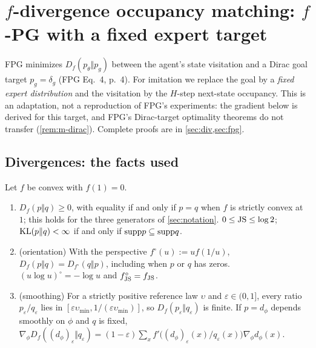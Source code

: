 \section{\texorpdfstring{$f$}{f}-divergence occupancy matching: \texorpdfstring{$f$}{f}-PG with a fixed expert target}\label{sec:m-fpg}

FPG minimizes $D_f(p_\theta\Vert p_g)$ between the agent's state visitation and a Dirac goal target $p_g=\delta_g$ (FPG Eq.~4, p.~4).
For imitation we replace the goal by a \emph{fixed expert distribution} and the visitation by the $H$-step next-state occupancy.
This is an adaptation, not a reproduction of FPG's experiments: the gradient below is derived for this target, and FPG's Dirac-target optimality theorems do not transfer (\cref{rem:m-dirac}).
Complete proofs are in \cref{sec:div,sec:fpg}.

\subsection{Divergences: the facts used}

\begin{proposition}\label{prop:m-div}
Let $f$ be convex with $f(1)=0$.
\begin{enumerate}[nosep,label=(\alph*)]
\item $D_f(p\Vert q)\ge0$, with equality if and only if $p=q$ when $f$ is strictly convex at $1$; this holds for the three generators of \cref{sec:notation}. $0\le\mathrm{JS}\le\log2$; $\mathrm{KL}(p\Vert q)<\infty$ if and only if $\mathrm{supp} p\subseteq\mathrm{supp} q$.
\item (orientation) With the perspective $f^\circ(u):=uf(1/u)$, $D_f(p\Vert q)=D_{f^\circ}(q\Vert p)$, including when $p$ or $q$ has zeros. $(u\log u)^\circ=-\log u$ and $f_{\mathrm{JS}}^\circ=f_{\mathrm{JS}}$.
\item (smoothing) For a strictly positive reference law $\upsilon$ and $\varepsilon\in(0,1]$, every ratio $p_\varepsilon/q_\varepsilon$ lies in $[\varepsilon\upsilon_{\min},1/(\varepsilon\upsilon_{\min})]$, so $D_f(p_\varepsilon\Vert q_\varepsilon)$ is finite. If $p=d_\phi$ depends smoothly on $\phi$ and $q$ is fixed, $\nabla_\phi D_f((d_\phi)_\varepsilon\Vert q_\varepsilon)=(1-\varepsilon)\sum_xf'\big((d_\phi)_\varepsilon(x)/q_\varepsilon(x)\big)\nabla_\phi d_\phi(x)$.
\end{enumerate}
\end{proposition}


